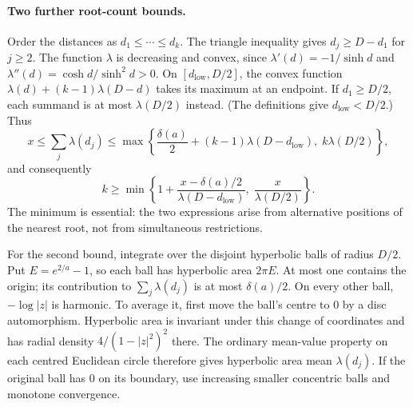 \documentclass[11pt]{article}
\begin{document}
\paragraph{Two further root-count bounds.}
Order the distances as $d_1\le\cdots\le d_k$. The triangle inequality gives
$d_j\ge D-d_1$ for $j\ge2$. The function $\lambda$ is decreasing and convex,
since $\lambda'(d)=-1/\sinh d$ and
$\lambda''(d)=\cosh d/\sinh^2d>0$. On
$[d_{\mathrm{low}},D/2]$, the convex function
$\lambda(d)+(k-1)\lambda(D-d)$ takes its maximum at an endpoint.
If $d_1\ge D/2$, each summand is at most $\lambda(D/2)$ instead.
(The definitions give $d_{\mathrm{low}}<D/2$.) Thus
\[
 x\le\sum_j\lambda(d_j)
 \le\max\left\{
  \frac{\delta(a)}2+(k-1)\lambda(D-d_{\mathrm{low}}),\;
  k\lambda(D/2)\right\},
\]
and consequently
\[
 k\ge\min\left\{
  1+\frac{x-\delta(a)/2}{\lambda(D-d_{\mathrm{low}})},\;
  \frac{x}{\lambda(D/2)}\right\}.
\]
The minimum is essential: the two expressions arise from alternative
positions of the nearest root, not from simultaneous restrictions.

For the second bound, integrate over the disjoint hyperbolic balls of
radius $D/2$. Put $E=e^{2/a}-1$, so each ball has hyperbolic area $2\pi E$.
At most one contains the origin; its contribution to
$\sum_j\lambda(d_j)$ is at most $\delta(a)/2$.
On every other ball, $-\log|z|$ is harmonic. To average it, first move
the ball's centre to $0$ by a disc automorphism. Hyperbolic area is
invariant under this change of coordinates and has radial density
$4/(1-|z|^2)^2$ there. The ordinary mean-value property on each centred
Euclidean circle therefore gives hyperbolic area mean
$\lambda(d_j)$. If the original ball has $0$ on its boundary, use
increasing smaller concentric balls and monotone convergence.
\end{document}
